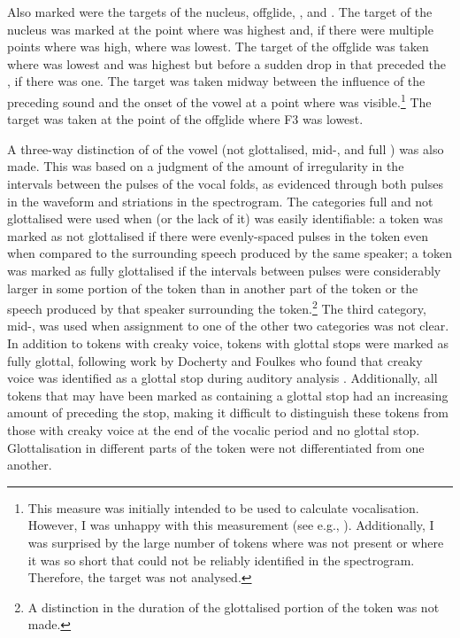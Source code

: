 \largerpage
\noindent Also marked were the targets of the nucleus, offglide, , and . The target of the nucleus was marked at the point where  was highest and, if there were multiple points where  was high, where  was lowest. The target of the offglide was taken where  was lowest and  was highest but before a sudden drop in  that preceded the , if there was one. The  target was taken midway between the influence of the preceding sound and the onset of the vowel at a point where  was visible.\footnote{This measure was initially intended to be used to calculate  vocalisation. However, I was unhappy with this measurement (see e.g., \citealt{halllewfix2012}). Additionally, I was surprised by the large number of tokens where  was not present or where it was so short that  could not be reliably identified in the spectrogram. Therefore, the  target was not analysed.} The  target was taken at the point of the offglide where F3 was lowest. 

A three-way distinction of  of the vowel (not glottalised, mid-, and full ) was also made. This was based on a judgment of the amount of irregularity in the intervals between the pulses of the vocal folds, as evidenced through both pulses in the waveform and striations in the spectrogram. The categories full and not glottalised were used when  (or the lack of it) was easily identifiable: a token was marked as not glottalised if there were evenly-spaced pulses in the token even when compared to the surrounding speech produced by the same speaker; a token was marked as fully glottalised if the intervals between pulses were considerably larger in some portion of the token than in another part of the token or the speech produced by that speaker surrounding the token.\footnote{A distinction in the duration of the glottalised portion of the token was not made.} The third category, mid-, was used when assignment to one of the other two categories was not clear. In addition to tokens with creaky voice, tokens with glottal stops were marked as fully glottal, following work by Docherty and Foulkes who found that creaky voice was identified as a glottal stop during auditory analysis \citep{dochertyfoulkes1999}. Additionally, all tokens that may have been marked as containing a glottal stop had an increasing amount of  preceding the stop, making it difficult to distinguish these tokens from those with creaky voice at the end of the vocalic period and no glottal stop. Glottalisation in different parts of the token were not differentiated from one another.

